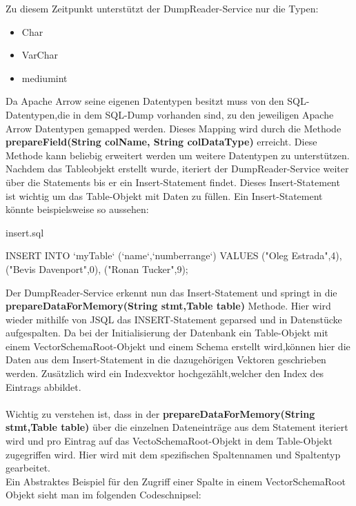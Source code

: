 Zu diesem Zeitpunkt unterstützt der DumpReader-Service nur die Typen:

\begin{itemize}
 \item Char
 \item VarChar
 \item mediumint
\end{itemize}

Da Apache Arrow seine eigenen Datentypen besitzt muss von den SQL-Datentypen,die in dem SQL-Dump vorhanden sind, zu den jeweiligen Apache Arrow Datentypen gemapped werden. 
Dieses Mapping wird durch die Methode \textbf{prepareField(String colName, String colDataType)} erreicht.
Diese Methode kann beliebig erweitert werden um weitere Datentypen zu unterstützen.\\
Nachdem das Tableobjekt erstellt wurde, iteriert der DumpReader-Service weiter über die Statements bis er ein Insert-Statement findet. Dieses Insert-Statement ist wichtig um das Table-Objekt mit Daten zu füllen.
Ein Insert-Statement könnte beispielsweise so aussehen:\\

\begin{terminalblock}{insert.sql}
  \begin{textcode}
INSERT INTO `myTable` (`name`,`numberrange`)
VALUES
  ("Oleg Estrada",4),
  ("Bevis Davenport",0),
  ("Ronan Tucker",9);
  \end{textcode}
\end{terminalblock}

Der DumpReader-Service erkennt nun das Insert-Statement und springt in die \textbf{prepareDataForMemory(String stmt,Table table)} Methode. Hier wird wieder mithilfe von JSQL das INSERT-Statement geparsed und in Datenstücke aufgespalten.
Da bei der Initialisierung der Datenbank ein Table-Objekt mit einem VectorSchemaRoot-Objekt und einem Schema erstellt wird,können hier die Daten aus dem Insert-Statement in die dazugehörigen Vektoren geschrieben werden.
Zusätzlich wird ein Indexvektor hochgezählt,welcher den Index des Eintrags abbildet.\\\\

Wichtig zu verstehen ist, dass in der \textbf{prepareDataForMemory(String stmt,Table table)} über die einzelnen Dateneinträge aus dem Statement iteriert wird und pro Eintrag auf das VectoSchemaRoot-Objekt in dem Table-Objekt zugegriffen wird. Hier wird mit dem spezifischen Spaltennamen und Spaltentyp gearbeitet.
\\
Ein Abstraktes Beispiel für den Zugriff einer Spalte in einem VectorSchemaRoot Objekt sieht man im folgenden Codeschnipsel:\\\\

